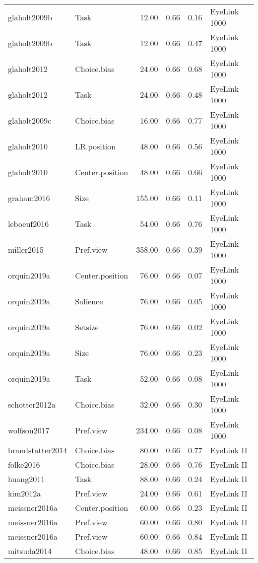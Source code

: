 \begin{table}[ht]
\begin{tabular}{llrrrl}
  glaholt2009b & Task & 12.00 & 0.66 & 0.16 & EyeLink 1000 \\ 
  glaholt2009b & Task & 12.00 & 0.66 & 0.47 & EyeLink 1000 \\ 
  glaholt2012 & Choice.bias & 24.00 & 0.66 & 0.68 & EyeLink 1000 \\ 
  glaholt2012 & Task & 24.00 & 0.66 & 0.48 & EyeLink 1000 \\ 
  glaholt2009c & Choice.bias & 16.00 & 0.66 & 0.77 & EyeLink 1000 \\ 
  glaholt2010 & LR.position & 48.00 & 0.66 & 0.56 & EyeLink 1000 \\ 
  glaholt2010 & Center.position & 48.00 & 0.66 & 0.66 & EyeLink 1000 \\ 
  graham2016 & Size & 155.00 & 0.66 & 0.11 & EyeLink 1000 \\ 
  leboeuf2016 & Task & 54.00 & 0.66 & 0.76 & EyeLink 1000 \\ 
  miller2015 & Pref.view & 358.00 & 0.66 & 0.39 & EyeLink 1000 \\ 
  orquin2019a & Center.position & 76.00 & 0.66 & 0.07 & EyeLink 1000 \\ 
  orquin2019a & Salience & 76.00 & 0.66 & 0.05 & EyeLink 1000 \\ 
  orquin2019a & Setsize & 76.00 & 0.66 & 0.02 & EyeLink 1000 \\ 
  orquin2019a & Size & 76.00 & 0.66 & 0.23 & EyeLink 1000 \\ 
  orquin2019a & Task & 52.00 & 0.66 & 0.08 & EyeLink 1000 \\ 
  schotter2012a & Choice.bias & 32.00 & 0.66 & 0.30 & EyeLink 1000 \\ 
  wolfson2017 & Pref.view & 234.00 & 0.66 & 0.08 & EyeLink 1000 \\ 
  brandstatter2014 & Choice.bias & 80.00 & 0.66 & 0.77 & EyeLink II \\ 
  folke2016 & Choice.bias & 28.00 & 0.66 & 0.76 & EyeLink II \\ 
  huang2011 & Task & 88.00 & 0.66 & 0.24 & EyeLink II \\ 
  kim2012a & Pref.view & 24.00 & 0.66 & 0.61 & EyeLink II \\ 
  meissner2016a & Center.position & 60.00 & 0.66 & 0.23 & EyeLink II \\ 
  meissner2016a & Pref.view & 60.00 & 0.66 & 0.80 & EyeLink II \\ 
  meissner2016a & Pref.view & 60.00 & 0.66 & 0.84 & EyeLink II \\ 
  mitsuda2014 & Choice.bias & 48.00 & 0.66 & 0.85 & EyeLink II \\ 

\end{tabular}
\end{table}
